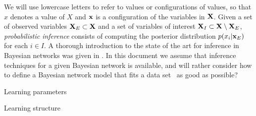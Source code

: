 We will use lowercase letters to refer to
values or configurations of values, so that $x$ denotes a value of $X$ and $\bx$ is a configuration of the
variables in $\bX$. 
Given a set of observed variables $\bX_E\subset \bX$ and a set of variables of interest $\bX_I\subset \bX \setminus \bX_E$,
\emph{probabilistic inference} consists of computing the posterior distribution
$
p(x_i|\bx_E)
$
for each $i\in I$. A thorough introduction to the state of the art for inference in Bayesian networks was given in \cite{D3.1}. In this document we assume that inference techniques for a given Bayesian network is available, and will rather consider how to define a Bayesian network model that fits a data set \calD\ as good as possible?   

\bit
\item Learning parameters
\item Learning structure
\eit



